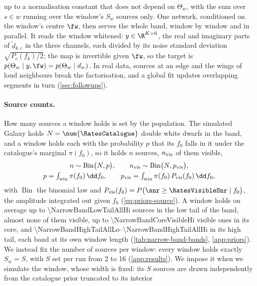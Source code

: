 up to a normalisation constant that does not depend on $\Theta_w$, with the sum over $s\in w$ running
over the window's $S_w$ sources only. One network, conditioned on the window's centre $\fw$, then
serves the whole band, window by window and in parallel. It reads the window whitened:
$y\in\R^{K\times6}$, the real and imaginary parts of $\tilde d_{k,c}$ in the three channels, each
divided by its noise standard deviation $\sqrt{P_c(f_k)/2}$; the map is
invertible given $\fw$, so the target is $p(\Theta_w\mid y,\fw) = p(\Theta_w\mid d_w)$. In real data,
sources at an edge and the wings of loud neighbours break the factorisation, and a global fit
updates overlapping segments in turn \citep{littenberg2020global} (\cref{sec:followups}).

\paragraph{Source counts.}
\label{sec:gw-rates}
How many sources a window holds is set by the population. The simulated Galaxy holds
$N = \num{\RatesCatalogue}$ double white dwarfs in the band, and a window holds each with the
probability $p$ that its $f_0$ falls in it under the catalogue's marginal $\pi(f_0)$, so it holds $n$
sources, $n_{\rm vis}$ of them visible,
\begin{equation}
\begin{gathered}
  n \sim \operatorname{Bin}\bigl(N, p\bigr),\qquad n_{\rm vis} \sim \operatorname{Bin}\bigl(N, p_{\rm vis}\bigr),\\
  p = \textstyle\int_{\rm win} \pi(f_0)\,\dd f_0,\qquad p_{\rm vis} = \textstyle\int_{\rm win} \pi(f_0)\,P_{\rm vis}(f_0)\,\dd f_0,
\end{gathered}
  \label{eq:gw-rates}
\end{equation}
with $\operatorname{Bin}$ the binomial law and $P_{\rm vis}(f_0) = P\bigl(\snr\ge\RatesVisibleSnr\mid f_0\bigr)$,
the amplitude integrated out given $f_0$ (\cref{eq:priors-source}). A window holds on average up to
\num{\NarrowBandLowTailAllHi} sources in the low tail of the band, almost none of them visible, up to
\num{\NarrowBandCoreVisibleHi} visible ones in its core, and
\numrange{\NarrowBandHighTailAllLo}{\NarrowBandHighTailAllHi} in its high tail, each band at its own
window length (\cref{tab:narrow-band-bands}, \cref{app:priors}).
We instead fix the number of sources per window: every window holds exactly $S_w = S$, with $S$ set
per run from 2 to 16 (\cref{app:results}). We impose it when we simulate the window, whose width is
fixed: its $S$ sources are drawn independently from the catalogue prior truncated to its interior
